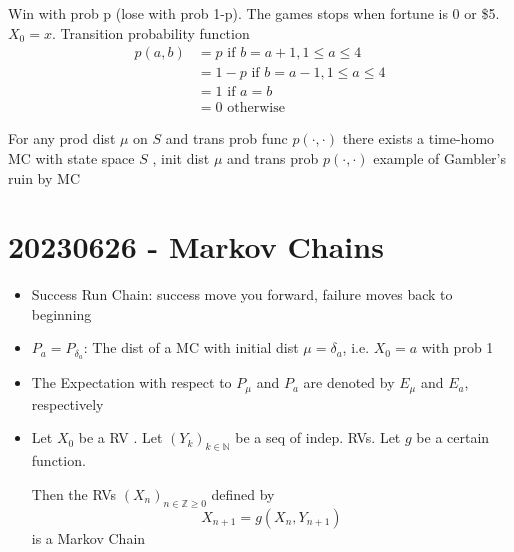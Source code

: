 \documentclass{report}
\begin{document}
\begin{itemize}
{\begin{itemize}
          Win with prob p (lose with prob 1-p).  The games stops when
          fortune is 0 or \$5.  $X_0 = x$.  Transition probability function
          \begin{align}
            p(a,b) &= p \text{ if } b = a+1, 1 \leq a \leq 4 \\
                   &= 1-p \text{ if } b = a-1, 1 \leq a \leq 4 \\
                   &= 1 \text{ if } a=b \\
                   &= 0 \text{ otherwise }
          \end{align}

           {
            For any prod dist $\mu$ on $S$ and trans prob func
            $p(\cdot,\cdot)$ there exists a time-homo MC with state space
            $S$ , init dist $\mu$ and trans prob $p(\cdot,\cdot)$
          }
           {
            example of Gambler's ruin by MC
          }
      \end{itemize}
    }
  \end{itemize}

\chapter*{20230626 - Markov Chains}
  \begin{itemize}
    \item  Success Run Chain: success move you forward, failure moves
      back to beginning
    \item $P_a = P_{\delta_a}$: The dist of a MC with initial dist
      $\mu = \delta_a$, i.e. $X_0 = a$ with prob 1
    \item The Expectation with respect to $P_{\mu}$ and $P_a$ are
      denoted by $E_{\mu}$ and $E_a$, respectively
    \item Let $X_0$ be a RV .  Let $(Y_k)_{k \in \mathbb{N}}$ be a seq
      of indep. RVs.  Let $g$ be a certain function.

      Then the RVs $(X_n)_{n \in \mathbb{Z} \geq 0}$ defined by 
      \[ X_{n+1} = g(X_n, Y_{n+1}) \]
      is a Markov Chain

  \end{itemize}
\end{document}
